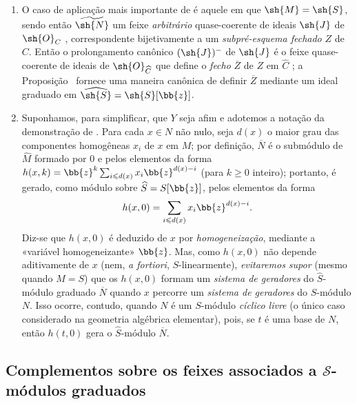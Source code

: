 \documentclass[oneside,10pt]{amsart}
\renewcommand{\leq}{\leqslant}
\renewcommand{\geq}{\geqslant}
\newcommand{\oldpage}[2][]{\marginnote{\normalfont\footnotesize\textbf{#1}~|~#2}\ignorespaces}
\let\EGAOriginalLabel\label
\renewcommand{\label}[1]{\phantomsection\EGAOriginalLabel{#1}}
\begin{document}
\begin{remark}[8.13.4]
\label{II.8.13.4}
\begin{enumerate}
    \item[\rm{(i)}] O caso de aplicação mais importante de  é aquele em que $\sh{M}=\sh{S}$, sendo então $\widetilde{\sh{N}}$ um feixe \emph{arbitrário} quase-coerente de ideais $\sh{J}$ de $\sh{O}_C$ , correspondente bijetivamente a um \emph{subpré-esquema fechado} $Z$ de $C$.
        Então o prolongamento canônico $(\sh{J})^-$ de $\sh{J}$ é o feixe quase-coerente de ideais de $\sh{O}_{\widehat{C}}$ que define o \emph{fecho} $\overline{Z}$ de $Z$ em $\widehat{C}$ ;
        a Proposição~ fornece uma maneira canônica de definir $\overline{Z}$ mediante um ideal graduado em $\widehat{\sh{S}}=\sh{S}[\bb{z}]$.
    \item[\rm{(ii)}] Suponhamos, para simplificar, que $Y$ seja afim e adotemos a notação da demonstração de .
        Para cada $x\in N$ não nulo, seja $d(x)$ o maior grau das componentes homogêneas $x_i$ de $x$ em $M$;
        por definição, $\overline{N}$ é o submódulo de $\widehat{M}$ formado por $0$ e pelos elementos da forma $h(x,k)=\bb{z}^k\sum_{i\leq d(x)}x_i\bb{z}^{d(x)-i}$ (para $k\geq0$ inteiro);
        portanto, é gerado, como módulo sobre $\widehat{S}=S[\bb{z}]$, pelos elementos da forma
        \[
            h(x,0) = \sum_{i\leq d(x)}x_i\bb{z}^{d(x)-i}.
        \]
\oldpage[II]{197}
        Diz-se que $h(x,0)$ é deduzido de $x$ por \emph{homogeneização}, mediante a «variável homogeneizante» $\bb{z}$.
        Mas, como $h(x,0)$ não depende aditivamente de $x$ (nem, \emph{a fortiori}, $S$-linearmente), \emph{evitaremos supor} (mesmo quando $M=S$) que os $h(x,0)$ formam um \emph{sistema de geradores} do $\widehat{S}$-módulo graduado $\overline{N}$ quando $x$ percorre um \emph{sistema de geradores} do $S$-módulo $N$.
        Isso ocorre, contudo, quando $N$ é um $S$-módulo \emph{cíclico livre} (o único caso considerado na geometria algébrica elementar), pois, se $t$ é uma base de $N$, então $h(t,0)$ gera o $\widehat{S}$-módulo $\overline{N}$.
\end{enumerate}
\end{remark}


\subsection{Complementos sobre os feixes associados a $\mathcal{S}$-módulos graduados}
\label{subsection:II.8.14}
\end{document}

